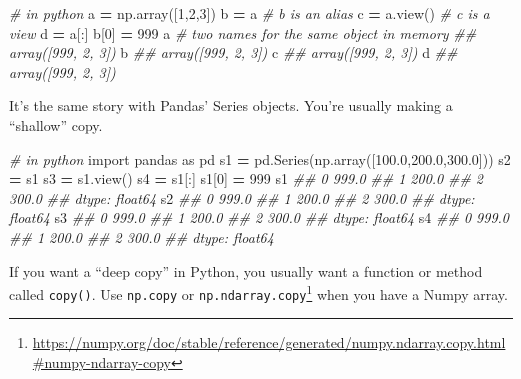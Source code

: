 \documentclass[
  12pt,
  krantz2]{krantz}
\makeatletter
\newenvironment{Shaded}{\begin{snugshade}}{\end{snugshade}}
\newcommand{\CommentTok}[1]{\textcolor[rgb]{0.37,0.37,0.37}{\textit{#1}}}
\newcommand{\DecValTok}[1]{\textcolor[rgb]{0.06,0.06,0.06}{#1}}
\newcommand{\FloatTok}[1]{\textcolor[rgb]{0.06,0.06,0.06}{#1}}
\newcommand{\ImportTok}[1]{#1}
\newcommand{\NormalTok}[1]{#1}
\newcommand{\OperatorTok}[1]{\textcolor[rgb]{0.43,0.43,0.43}{\textbf{#1}}}
\renewcommand{\href}[2]{#2\footnote{\url{#1}}}
\newenvironment{kframe}{%
\medskip{}
\setlength{\fboxsep}{.8em}
 \def\at@end@of@kframe{}%
 \ifinner\ifhmode%
  \def\at@end@of@kframe{\end{minipage}}%
  \begin{minipage}{\columnwidth}%
 \fi\fi%
 \def\FrameCommand##1{\hskip\@totalleftmargin \hskip-\fboxsep
 \colorbox{shadecolor}{##1}\hskip-\fboxsep
     \hskip-\linewidth \hskip-\@totalleftmargin \hskip\columnwidth}%
 \MakeFramed {\advance\hsize-\width
   \@totalleftmargin\z@ \linewidth\hsize
   \@setminipage}}%
 {\par\unskip\endMakeFramed%
 \at@end@of@kframe}
\renewenvironment{Shaded}{\begin{kframe}}{\end{kframe}}
\makeatother
\begin{document}
\begin{Shaded}
\begin{Highlighting}[]
\CommentTok{\# in python}
\NormalTok{a }\OperatorTok{=}\NormalTok{ np.array([}\DecValTok{1}\NormalTok{,}\DecValTok{2}\NormalTok{,}\DecValTok{3}\NormalTok{])}
\NormalTok{b }\OperatorTok{=}\NormalTok{ a }\CommentTok{\# b is an alias}
\NormalTok{c }\OperatorTok{=}\NormalTok{ a.view() }\CommentTok{\# c is a view}
\NormalTok{d }\OperatorTok{=}\NormalTok{ a[:]}
\NormalTok{b[}\DecValTok{0}\NormalTok{] }\OperatorTok{=} \DecValTok{999}
\NormalTok{a }\CommentTok{\# two names for the same object in memory}
\CommentTok{\#\# array([999,   2,   3])}
\NormalTok{b}
\CommentTok{\#\# array([999,   2,   3])}
\NormalTok{c}
\CommentTok{\#\# array([999,   2,   3])}
\NormalTok{d}
\CommentTok{\#\# array([999,   2,   3])}
\end{Highlighting}
\end{Shaded}

It's the same story with Pandas' Series objects. You're usually making a ``shallow'' copy.

\begin{Shaded}
\begin{Highlighting}[]
\CommentTok{\# in python}
\ImportTok{import}\NormalTok{ pandas }\ImportTok{as}\NormalTok{ pd}
\NormalTok{s1 }\OperatorTok{=}\NormalTok{ pd.Series(np.array([}\FloatTok{100.0}\NormalTok{,}\FloatTok{200.0}\NormalTok{,}\FloatTok{300.0}\NormalTok{]))}
\NormalTok{s2 }\OperatorTok{=}\NormalTok{ s1}
\NormalTok{s3 }\OperatorTok{=}\NormalTok{ s1.view()}
\NormalTok{s4 }\OperatorTok{=}\NormalTok{ s1[:]}
\NormalTok{s1[}\DecValTok{0}\NormalTok{] }\OperatorTok{=} \DecValTok{999}
\NormalTok{s1}
\CommentTok{\#\# 0    999.0}
\CommentTok{\#\# 1    200.0}
\CommentTok{\#\# 2    300.0}
\CommentTok{\#\# dtype: float64}
\NormalTok{s2}
\CommentTok{\#\# 0    999.0}
\CommentTok{\#\# 1    200.0}
\CommentTok{\#\# 2    300.0}
\CommentTok{\#\# dtype: float64}
\NormalTok{s3}
\CommentTok{\#\# 0    999.0}
\CommentTok{\#\# 1    200.0}
\CommentTok{\#\# 2    300.0}
\CommentTok{\#\# dtype: float64}
\NormalTok{s4}
\CommentTok{\#\# 0    999.0}
\CommentTok{\#\# 1    200.0}
\CommentTok{\#\# 2    300.0}
\CommentTok{\#\# dtype: float64}
\end{Highlighting}
\end{Shaded}

If you want a ``deep copy'' in Python, you usually want a function or method called \texttt{copy()}. Use \texttt{np.copy} or \href{https://numpy.org/doc/stable/reference/generated/numpy.ndarray.copy.html\#numpy-ndarray-copy}{\texttt{np.ndarray.copy}} when you have a Numpy array.
\end{document}
